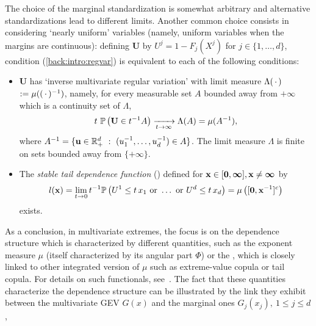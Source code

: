 The choice of the marginal standardization is somewhat arbitrary and alternative standardizations  lead
to different limits. Another common choice consists in considering `nearly
uniform' 
variables (namely, uniform variables when the margins are continuous): defining $\mathbf{U}$ by $U^j =1-F_j(X^j)$ for
$j\in\{1,\ldots,d\}$,   %
condition (\ref{back:intro:regvar}) is equivalent to each of the  following conditions:
\begin{itemize}
\item $\mathbf{U}$ has  `inverse multivariate regular variation' %
  with limit measure $\Lambda(\,\cdot\,)$ $:=\mu((\,\cdot\,)^{-1})$, namely,
  for every measurable set $A$ bounded away from $+\boldsymbol{\infty}$ which is a
  continuity set of $\Lambda$,
\begin{align}
\label{back:reg_var_U}
t~ \mathbb{P}\left( \mathbf U \in t^{-1} A\right)
\xrightarrow[t\to\infty]{} \Lambda(A) = \mu(A^{-1}), 
\end{align}
where $A^{-1} = \{\mathbf u \in \mathbb{R}^{d}_+ ~:~(u_1^{-1},\ldots,u_d^{-1})
\in A\}$. The limit measure $\Lambda$ is finite on sets bounded away from $\{+\boldsymbol{\infty}\}$. 
\item The \textit{stable tail dependence function} (\stdf) defined for $\mathbf x\in[\mathbf 0,\boldsymbol{\infty}], \mathbf x\neq\boldsymbol{\infty}$ by 
\begin{align}
\label{back:stdf1}
l(\mathbf x) = \lim_{t \to 0} t^{-1} \mathbb{P} \left( U^1 \le t\, x_1 ~\text{or}~ \ldots ~\text{or}~ U^d \le t\,x_d  \right)
 = \mu\left([\mathbf 0, \mathbf{x}^{-1}]^c\right) 
\end{align}
exists. 
\end{itemize}

As a conclusion, in multivariate extremes, the focus is on the dependence structure which is characterized by different quantities, such as the exponent measure $\mu$ (itself characterized by its angular part $\Phi$) or the \stdf, which is closely linked to other integrated version of $\mu$ such as extreme-value copula or tail copula. For details on such functionals, see~\cite{Segers12}.
The fact that these quantities characterize the dependence structure can be illustrated by the link they exhibit between the multivariate GEV $G(x)$ and the marginal ones $G_j(x_j),~1 \le j \le d$,

